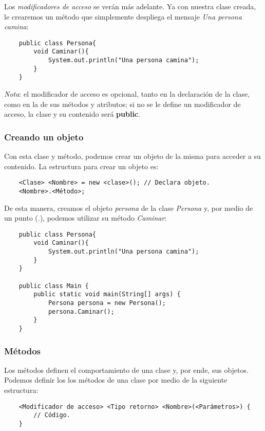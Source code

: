 Los \textit{modificadores de acceso} se verán más adelante. Ya con nuestra clase creada, le crearemos un método que simplemente despliega el mensaje \textit{Una persona camina}:
\begin{lstlisting}
    public class Persona{
        void Caminar(){
            System.out.println("Una persona camina");
        }
    }
\end{lstlisting}

\textit{Nota}: el modificador de acceso es opcional, tanto en la declaración de la clase, como en la de sus métodos y atributos; si no se le define un modificador de acceso, la clase y su contenido será \textbf{public}.


\subsubsection{Creando un objeto}

Con esta clase y método, podemos crear un objeto de la misma para acceder a su contenido. La estructura para crear un objeto es:
\begin{lstlisting}
    <Clase> <Nombre> = new <clase>(); // Declara objeto.
    <Nombre>.<Método>;
\end{lstlisting}

De esta manera, creamos el objeto \textit{persona} de la clase \textit{Persona} y, por medio de un punto (.), podemos utilizar su método \textit{Caminar}:
\begin{lstlisting}
    public class Persona{
        void Caminar(){
            System.out.println("Una persona camina");
        }
    }
    
    public class Main {
        public static void main(String[] args) {
            Persona persona = new Persona();
            persona.Caminar();
        }
    }
\end{lstlisting}


\subsubsection{Métodos}
\hspace{0.55cm}Los métodos definen el comportamiento de una clase y, por ende, sus objetos. Podemos definir los los métodos de una clase por medio de la siguiente estructura:
\begin{lstlisting}
    <Modificador de acceso> <Tipo retorno> <Nombre>(<Parámetros>) {
        // Código.
    }
\end{lstlisting}

